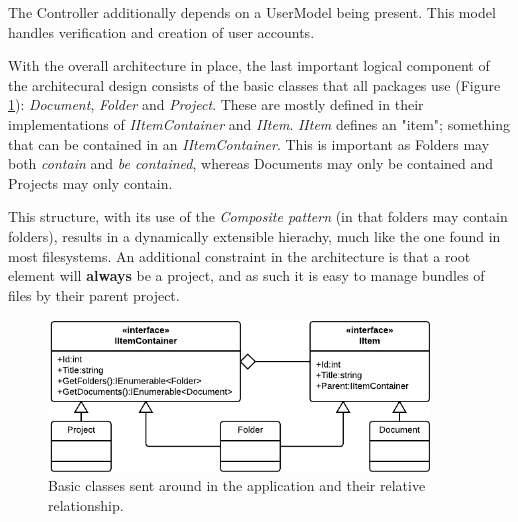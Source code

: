 The Controller additionally depends on a UserModel being present. This model handles verification
and creation of user accounts.

With the overall architecture in place, the last important logical component of the architecural design
consists of the basic classes that all packages use (Figure \ref{fig:basic-classes}): \emph{Document},
\emph{Folder} and \emph{Project}. These are mostly defined in their implementations of \emph{IItemContainer}
and \emph{IItem}. \emph{IItem} defines an "item"; something that can be contained in an
\emph{IItemContainer}. This is important as Folders may both \emph{contain} and \emph{be contained},
whereas Documents may only be contained and Projects may only contain.

This structure, with its use of the \emph{Composite pattern} (in that folders may contain folders), results in a
dynamically extensible hierachy, much like the one found in most filesystems. An additional constraint
in the architecture is that a root element will {\bf always} be a project, and as such it is easy to
manage bundles of files by their parent project.

\begin{figure}[htb]
	\centering
	\includegraphics[width=0.9\textwidth]{Software_architecture/graphics/basic-classes.png}
	\caption{Basic classes sent around in the application and their relative relationship.}
	\label{fig:basic-classes}
\end{figure}